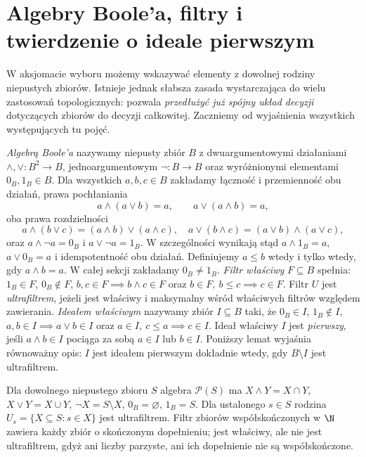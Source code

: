 \section{Algebry Boole'a, filtry i twierdzenie o ideale pierwszym}
\label{sec:weak-choice-bpi}
W aksjomacie wyboru możemy wskazywać elementy z dowolnej rodziny
niepustych zbiorów. Istnieje jednak słabsza zasada wystarczająca
do wielu zastosowań topologicznych: pozwala \emph{przedłużyć już
spójny układ decyzji} dotyczących zbiorów do decyzji całkowitej.
Zaczniemy od wyjaśnienia wszystkich występujących tu pojęć.

\begin{definicja}\label{def:bpi-boolean-filter}
\emph{Algebrą Boole'a} nazywamy niepusty
zbiór $B$ z dwuargumentowymi działaniami
$\wedge,\vee:B^2\to B$,
jednoargumentowym $\neg:B\to B$
oraz wyróżnionymi elementami $0_B,1_B\in B$.
Dla wszystkich $a,b,c\in B$ zakładamy
łączność i przemienność obu działań,
prawa pochłaniania
\[
a\wedge(a\vee b)=a,\qquad
a\vee(a\wedge b)=a,
\]
oba prawa rozdzielności
\[
a\wedge(b\vee c)=(a\wedge b)\vee(a\wedge c),
\quad
a\vee(b\wedge c)=(a\vee b)\wedge(a\vee c),
\]
oraz $a\wedge\neg a=0_B$
i $a\vee\neg a=1_B$.
W szczególności wynikają stąd
$a\wedge1_B=a$, $a\vee0_B=a$
i idempotentność obu działań.
Definiujemy $a\leq b$ wtedy i tylko wtedy, gdy $a\wedge b=a$.
W całej sekcji zakładamy $0_B\ne1_B$.
\emph{Filtr właściwy} $F\subseteq B$ spełnia:
$1_B\in F$, $0_B\notin F$,
$b,c\in F\implies b\wedge c\in F$ oraz
$b\in F,\ b\leq c\implies c\in F$.
Filtr $U$ jest \emph{ultrafiltrem}, jeżeli jest właściwy i
maksymalny wśród właściwych filtrów względem zawierania.
\emph{Ideałem właściwym} nazywamy zbiór
$I\subseteq B$ taki, że
$0_B\in I$, $1_B\notin I$,
$a,b\in I\implies a\vee b\in I$ oraz
$a\in I,\ c\le a\implies c\in I$.
Ideał właściwy $I$ jest \emph{pierwszy}, jeśli
$a\wedge b\in I$ pociąga za sobą
$a\in I$ lub $b\in I$.
Poniższy lemat wyjaśnia równoważny opis:
$I$ jest ideałem pierwszym dokładnie wtedy,
gdy $B\setminus I$ jest ultrafiltrem.
\end{definicja}
\begin{przyklad}
Dla dowolnego niepustego zbioru $S$
algebra $\mathcal P(S)$ ma
$X\wedge Y=X\cap Y$, $X\vee Y=X\cup Y$,
$\neg X=S\setminus X$, $0_B=\varnothing$, $1_B=S$.
Dla ustalonego $s\in S$ rodzina
$U_s=\{X\subseteq S:s\in X\}$ jest ultrafiltrem.
Filtr zbiorów współskończonych w $\N$ zawiera każdy zbiór
o skończonym dopełnieniu; jest właściwy, ale nie jest
ultrafiltrem, gdyż ani liczby parzyste, ani ich dopełnienie
nie są współskończone.
\end{przyklad}

